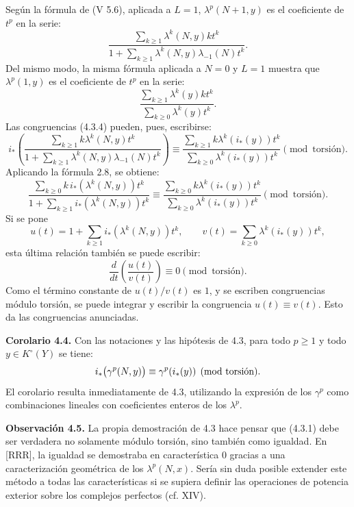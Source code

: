 Según la fórmula de (V 5.6), aplicada a \(L=1\), \(\lambda^p(N+1,y)\) es el coeficiente de \(t^p\) en la serie:
\[
  \frac{\sum_{k\ge1}\lambda^k(N,y)kt^k}
       {1+\sum_{k\ge1}\lambda^k(N,y)\lambda_{-1}(N)t^k}.
\]
Del mismo modo, la misma fórmula aplicada a \(N=0\) y \(L=1\) muestra que \(\lambda^p(1,y)\) es el coeficiente de \(t^p\) en la serie:
\[
  \frac{\sum_{k\ge1}\lambda^k(y)kt^k}
       {\sum_{k\ge0}\lambda^k(y)t^k}.
\]
Las congruencias (4.3.4) pueden, pues, escribirse:
\[
i_*\left(
  \frac{\sum_{k\ge1}k\lambda^k(N,y)t^k}
       {1+\sum_{k\ge1}\lambda^k(N,y)\lambda_{-1}(N)t^k}
\right)
\equiv
  \frac{\sum_{k\ge1}k\lambda^k(i_*(y))t^k}
       {\sum_{k\ge0}\lambda^k(i_*(y))t^k}
       \pmod{\text{torsión}}.
\]
Aplicando la fórmula 2.8, se obtiene:
\[
  \frac{\sum_{k\ge0}k\,i_*(\lambda^k(N,y))t^k}
       {1+\sum_{k\ge1} i_*(\lambda^k(N,y))t^k}
  \equiv
  \frac{\sum_{k\ge0}k\lambda^k(i_*(y))t^k}
       {\sum_{k\ge0}\lambda^k(i_*(y))t^k}
       \pmod{\text{torsión}}.
\]
Si se pone
\[
  u(t)=1+\sum_{k\ge1}i_*(\lambda^k(N,y))t^k,\qquad
  v(t)=\sum_{k\ge0}\lambda^k(i_*(y))t^k,
\]
esta última relación también se puede escribir:
\[
  \frac{d}{dt}\!\left(\frac{u(t)}{v(t)}\right)\equiv0
  \pmod{\text{torsión}}.
\]
Como el término constante de \(u(t)/v(t)\) es \(1\), y se escriben congruencias módulo torsión, se puede integrar y escribir la congruencia \(u(t)\equiv v(t)\). Esto da las congruencias anunciadas.

\textbf{Corolario 4.4.} Con las notaciones y las hipótesis de 4.3, para todo \(p\ge1\) y todo \(y\in K^\circ(Y)\) se tiene:
\[
  i_*\bigl(\gamma^p(N,y)\bigr)\equiv \gamma^p(\sisi{i'_*}{i_*}(y))
  \pmod{\text{torsión}}.
\]
El corolario resulta inmediatamente de 4.3, utilizando la expresión de los \(\gamma^p\) como combinaciones lineales con coeficientes enteros de los \(\lambda^p\).

\textbf{Observación 4.5.} La propia demostración de 4.3 hace pensar que (4.3.1) debe ser verdadera no solamente módulo torsión, sino también como igualdad. En [RRR], la igualdad se demostraba en característica \(0\) gracias a una caracterización geométrica de los \(\lambda^p(N,x)\). Sería sin duda posible extender este método a todas las características si se supiera definir las operaciones de potencia exterior sobre los complejos perfectos (cf. XIV).

